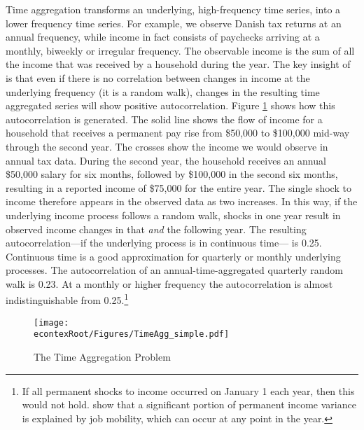 \documentclass[titlepage]{\econtex}\newcommand{\texname}{ConsumptionHeterogeneity}
\begin{document}
	Time aggregation transforms an underlying, high-frequency time series, into a lower frequency time series.
	For example, we observe Danish tax returns at an annual frequency, while income in fact consists of paychecks arriving at a monthly, biweekly or irregular frequency.
	The observable income is the sum of all the income that was received by a household during the year. The key insight of  is that even if there is no correlation between changes in income at the underlying frequency (it is a random walk), changes in the resulting time aggregated series will show positive autocorrelation.
	Figure \ref{fig:TimeAgg} shows how this autocorrelation is generated. The solid line shows the flow of income for a household that receives a permanent pay rise from \$50,000 to \$100,000 mid-way through the second year.
	The crosses show the income we would observe in annual tax data.
	During the second year, the household receives an annual \$50,000 salary for six months, followed by \$100,000 in the second six months, resulting in a reported income of \$75,000 for the entire year.
	The single shock to income therefore appears in the observed data as two increases.
	In this way, if the underlying income process follows a random walk, shocks in one year result in observed income changes in that \textit{and} the following year. The resulting autocorrelation---if the underlying process is in continuous time--- is 0.25.
	Continuous time is a good approximation for quarterly or monthly underlying processes.
	The autocorrelation of an annual-time-aggregated quarterly random walk is 0.23.
	At a monthly or higher frequency the autocorrelation is almost indistinguishable from 0.25.\footnote{If all permanent shocks to income occurred on January 1 each year, then this would not hold.  show that a significant portion of permanent income variance is explained by job mobility, which can occur at any point in the year.}
	\begin{figure} 
		\begin{centering}
			\texttt{[image: \\econtexRoot/Figures/TimeAgg\_simple.pdf]} 
			\caption{The Time Aggregation Problem}
			\label{fig:TimeAgg}
		\end{centering}
	\end{figure}
	
\end{document}
